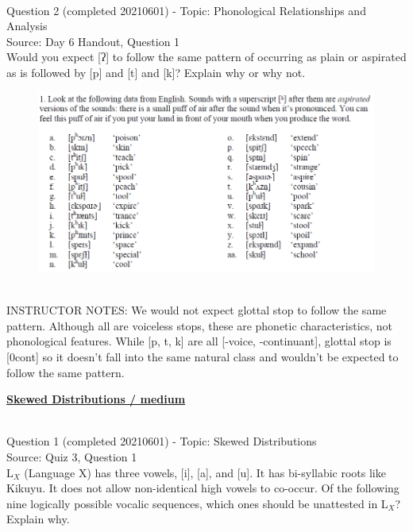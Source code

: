 \documentclass[12pt]{article}
\begin{document}
~\\

{\large Question 2} (completed 20210601) - Topic: Phonological Relationships and Analysis\\
Source: Day 6 Handout, Question 1\\

Would you expect [ʔ] to follow the same pattern of occurring as plain or aspirated as is followed by [p] and [t] and [k]? Explain why or why not.\\

\begin{figure}[H]
\includegraphics{../images/aspiration.png}
\end{figure}

~\\
INSTRUCTOR NOTES: We would not expect glottal stop to follow the same pattern. Although all are voiceless stops, these are phonetic characteristics, not phonological features. While [p, t, k] are all [-voice, -continuant], glottal stop is [0cont] so it doesn't fall into the same natural class and wouldn't be expected to follow the same pattern.


\newpage\textbf{\underline{\huge Skewed Distributions / medium\\}}

~\\

{\large Question 1} (completed 20210601) - Topic: Skewed Distributions\\
Source: Quiz 3, Question 1\\

L$_X$ (Language X) has three vowels, [i], [a], and [u]. It has bi-syllabic roots like Kikuyu. It does not allow non-identical high vowels to co-occur. Of the following nine logically possible vocalic sequences, which ones should be unattested in L$_X$? Explain why.\\
\end{document}
